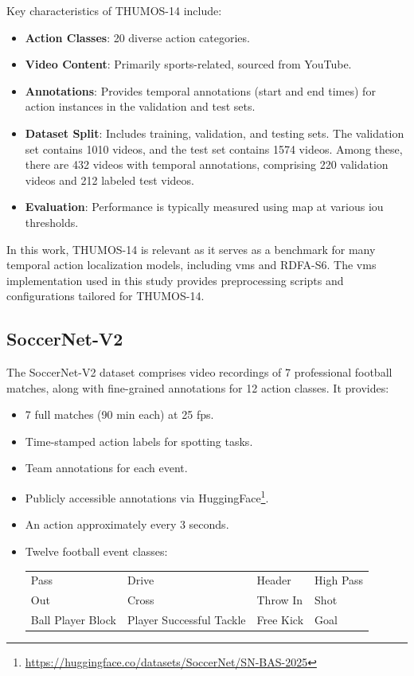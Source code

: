 Key characteristics of THUMOS-14 include:
\begin{itemize}
    \item \textbf{Action Classes}: 20 diverse action categories.
    \item \textbf{Video Content}: Primarily sports-related, sourced from YouTube.
    \item \textbf{Annotations}: Provides temporal annotations (start and end times) for action instances in the validation and test sets.
    \item \textbf{Dataset Split}: Includes training, validation, and testing sets. The validation set contains 1010 videos, and the test set contains 1574 videos. Among these, there are 432 videos with temporal annotations, comprising 220 validation videos and 212 labeled test videos. 
    \item \textbf{Evaluation}: Performance is typically measured using \acrfull{map} at various \acrfull{iou} thresholds.
\end{itemize}

In this work, THUMOS-14 is relevant as it serves as a benchmark for many temporal action localization models, including \acrshort{vms} and RDFA-S6. The \acrshort{vms} implementation used in this study provides preprocessing scripts and configurations tailored for THUMOS-14.

\subsection{SoccerNet-V2}
\label{ssec:dataset_soccernet}

The SoccerNet-V2 dataset \cite{deliege_soccernet-v2_dataset_2021} comprises video recordings of 7 professional football matches, along with fine-grained annotations for 12 action classes. It provides:
\begin{itemize}
    \item 7 full matches (90 min each) at 25 fps.
    \item Time-stamped action labels for spotting tasks.
    \item Team annotations for each event.
    \item Publicly accessible annotations via HuggingFace\footnote{\url{https://huggingface.co/datasets/SoccerNet/SN-BAS-2025}}.
    \item An action approximately every 3 seconds. 
    \item Twelve football event classes:
        \begin{center}
            \begin{tabular}{llll}
                Pass & Drive & Header & High Pass \\
                Out & Cross & Throw In & Shot \\
                Ball Player Block & Player Successful Tackle & Free Kick & Goal
            \end{tabular}
        \end{center}
\end{itemize}

